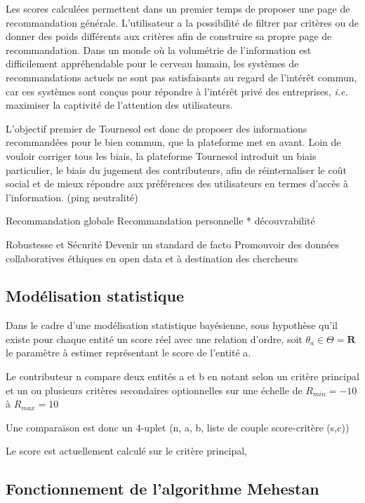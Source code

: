 Les scores calculées permettent dans un premier temps de proposer une page de recommandation générale. L'utilisateur a la possibilité de filtrer par critères ou de donner des poids différents aux critères afin de construire sa propre page de recommandation. Dans un monde où la volumétrie de l'information est difficilement appréhendable pour le cerveau humain, les systèmes de recommandations actuels ne sont pas satisfaisants au regard de l'intérêt commun, car ces systèmes sont conçus pour répondre à l'intérêt privé des entreprises, \textit{i.e.} maximiser la captivité de l'attention des utilisateurs. 

L'objectif premier de Tournesol est donc de proposer des informations recommandées pour le bien commun, que la plateforme met en avant. Loin de vouloir corriger tous les biais, la plateforme Tournesol introduit un biais particulier, le biais du jugement des contributeurs, afin de réinternaliser le coût social et de mieux répondre aux préférences des utilisateurs en termes d'accès à l'information. 
(ping neutralité)

Recommandation globale
Recommandation personnelle * découvrabilité

Robustesse et Sécurité
Devenir un standard de facto
Promouvoir des données collaboratives éthiques en open data et à destination des chercheurs

\subsection{Modélisation statistique}

Dans le cadre d'une modélisation statistique bayésienne, sous hypothèse qu'il existe pour chaque entité un score réel avec une relation d'ordre, soit $\theta_{a}\in\Theta=\mathbf{R}$ le paramètre à estimer représentant le score de l'entité a.

Le contributeur n compare deux entités a et b en notant selon un critère principal et un ou plusieurs critères secondaires optionnelles sur une échelle de $R_{min}=-10$ à $R_{max}=10$

Une comparaison est donc un 4-uplet (n, a, b, liste de couple score-critère (s,c))

Le score est actuellement calculé sur le critère principal,

\subsection{Fonctionnement de l'algorithme Mehestan}


